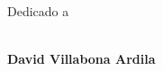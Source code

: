 \newpage
\begin{multicols}{2}
\vfill\null
\columnbreak
\footnotesize
\begin{itshape}
\hspace{5.7cm}\\ Dedicado a\\

\end{itshape}\\

\raggedleft
\normalsize \textbf{David Villabona Ardila}
\end{multicols}